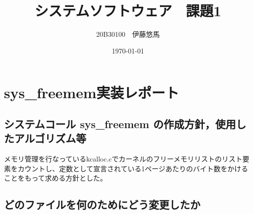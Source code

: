 \documentclass[a4j,12pt]{jreport}
\title{システムソフトウェア　課題1}
\author{20B30100　伊藤悠馬}
\date{\today}
\begin{document}
\maketitle

\chapter{sys\_freemem実装レポート}

\section{システムコール sys\_freemem の作成方針，使用したアルゴリズム等}

メモリ管理を行なっているkcalloc.cでカーネルのフリーメモリリストのリスト要素をカウントし、定数として宣言されている1ページあたりのバイト数をかけることをもって求める方針とした。

\section{どのファイルを何のためにどう変更したか}
\end{document}
